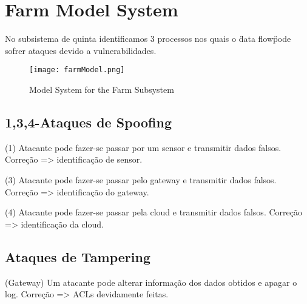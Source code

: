 \section{Farm Model System}

No subsistema de quinta identificamos 3 processos nos quais o \"data flow\" pode sofrer ataques devido a vulnerabilidades.

\begin{figure}[h!]

	\centering

 	\texttt{[image: farmModel.png]}

 	\caption {Model System for the Farm Subsystem}

  	\label {fig02}
\end{figure}

\subsection{1,3,4-Ataques de Spoofing}
\par\hfill
\par (1) Atacante pode fazer-se passar por um sensor e transmitir dados falsos.\newline
Correção => identificação de sensor.\newline

\par (3) Atacante pode fazer-se passar pelo gateway e transmitir dados falsos.\newline
Correção => identificação do gateway.\newline

\par (4) Atacante pode fazer-se passar pela cloud e transmitir dados falsos.\newline
Correção => identificação da cloud.\newline

\subsection{Ataques de Tampering}
\par\hfill
\par(Gateway) Um atacante pode alterar informação dos dados obtidos e apagar o log. \newline
Correção => ACLs devidamente feitas.\newline


